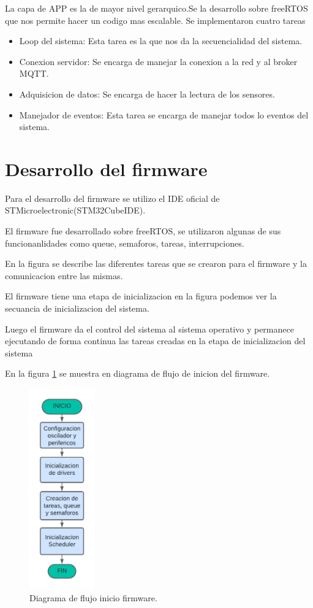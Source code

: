 La capa de APP es la de mayor nivel gerarquico.Se la desarrollo sobre freeRTOS que nos permite hacer un codigo mas escalable.
Se implementaron cuatro tareas
\begin{itemize}
    \item Loop del sistema: Esta tarea es la que nos da la secuencialidad del sistema.
    \item Conexion servidor: Se encarga de manejar la conexion a la red y al broker MQTT.
    \item Adquisicion de datos: Se encarga de hacer la lectura de los sensores.
    \item Manejador de eventos: Esta tarea se encarga de manejar todos lo eventos del sistema.
  \end{itemize}

\section{Desarrollo del firmware}
Para el desarrollo del firmware se utilizo el IDE oficial de STMicroelectronic(STM32CubeIDE).

El firmware fue desarrollado sobre freeRTOS, se utilizaron algunas de sus funcionanlidades como queue, semaforos, tareas, interrupciones.




En la figura se describe las diferentes tareas que se crearon para el firmware y la comunicacion entre las mismas.


El firmware tiene una etapa de inicializacion en la figura podemos ver la secuancia de inicializacion del sistema.

Luego el firmware da el control del sistema al sistema operativo y permanece ejecutando de forma continua las tareas creadas en la etapa de inicializacion del sistema 


En la figura \ref{fig:Df inicio firmware}  se muestra en diagrama de flujo de inicion del firmware.

\begin{figure}[htbp]
  \centering
	\includegraphics[width=0.25\textwidth]{./Figures/DF inicio firmware.png}
	\caption{Diagrama de flujo inicio firmware.}
	\label{fig:Df inicio firmware}
\end{figure}

